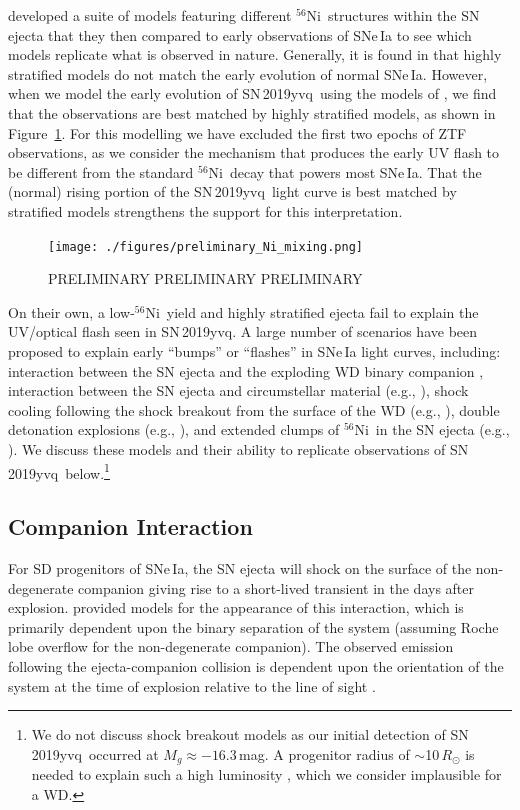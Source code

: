 \documentclass[twocolumn]{aastex63}
\newcommand{\radni}{$^{56}$Ni}
\newcommand{\sn}{SN\,2019yvq}
\begin{document}
\citet{Magee20} developed a suite of models featuring different \radni\
structures within the SN ejecta that they then compared to early observations
of SNe\,Ia to see which models replicate what is observed in nature.
Generally, it is found in \citet{Magee20} that highly stratified models do not
match the early evolution of normal SNe\,Ia. However, when we model the early
evolution of \sn\ using the models of \citet{Magee20}, we find that the
observations are best matched by highly stratified models, as shown in
Figure~\ref{fig:Ni_mixing}. For this modelling we have excluded the first two
epochs of ZTF observations, as we consider the mechanism that produces the
early UV flash to be different from the standard \radni\ decay that powers
most SNe\,Ia. That the (normal) rising portion of the \sn\ light curve is best
matched by stratified models strengthens the support for this interpretation.

\begin{figure}
    \centering
    \texttt{[image: ./figures/preliminary\_Ni\_mixing.png]}
    \caption{PRELIMINARY PRELIMINARY PRELIMINARY}
    \label{fig:Ni_mixing}
\end{figure}

On their own, a low-\radni\ yield and highly stratified ejecta fail to explain
the UV/optical flash seen in \sn. A large number of scenarios have been
proposed to explain early ``bumps'' or ``flashes'' in SNe\,Ia light curves,
including: interaction between the SN ejecta and the exploding WD binary
companion \citep{Kasen10a}, interaction between the SN ejecta and
circumstellar material (e.g., \citealt{Dessart14,Piro16}), shock cooling
following the shock breakout from the surface of the WD (e.g.,
\citealt{Piro10,Rabinak11}), double detonation explosions (e.g.,
\citealt{Noebauer17,Polin19}), and extended clumps of \radni\ in the SN ejecta
(e.g., \citealt{Shappee19,Dimitriadis19}). We discuss these models and their
ability to replicate observations of \sn\ below.\footnote{We do not discuss
shock breakout models as our initial detection of \sn\ occurred at $M_g
\approx -16.3$\,mag. A progenitor radius of $\sim$10$\,R_\odot$ is needed to
explain such a high luminosity \citep{Piro10,Rabinak11}, which we consider
implausible for a WD.}

\subsection{Companion Interaction}

For SD progenitors of SNe\,Ia, the SN ejecta will shock on the surface of the
non-degenerate companion giving rise to a short-lived transient in the days
after explosion. \citet{Kasen10a} provided models for the appearance of this
interaction, which is primarily dependent upon the binary separation of the
system (assuming Roche lobe overflow for the non-degenerate companion). The
observed emission following the ejecta-companion collision is dependent upon
the orientation of the system at the time of explosion relative to the line of
sight \citep{Kasen10a}.
\end{document}
